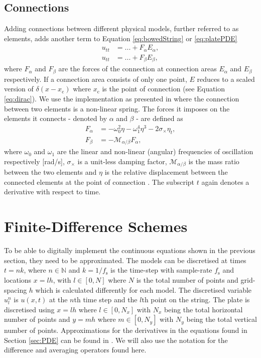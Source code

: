 \documentclass{article}
\begin{document}
\subsection{Connections}\label{sec:connections}
Adding connections between different physical models, further referred to as elements, adds another term to Equation \eqref{eq:bowedString} or \eqref{eq:platePDE}
\begin{equation}
\begin{aligned}
    u_{tt} &= ... + F_\alpha E_\alpha, \\
    u_{tt} &= ... + F_\beta E_\beta,
\end{aligned}
\end{equation}
where $F_\alpha$ and $F_\beta$ are the forces of the connection at connection areas $E_\alpha$ and $E_\beta$ respectively. If a connection area consists of only one point, $E$ reduces to a scaled version of $\delta(x-x_\text{c})$ where $x_\text{c}$ is the point of connection (see Equation \eqref{eq:dirac}). We use the implementation as presented in \cite{Bilbao2009:ModularPercussion} where the connection between two elements is a non-linear spring. The forces it imposes on the elements it connects - denoted by $\alpha$ and $\beta$ - are defined as
\begin{subequations}\label{eq:connectionsPDE}
\begin{align}
    F_\alpha &= -\omega_0^2\eta - \omega_1^4\eta^3 - 2\sigma_\times\eta_t,\\
    F_\beta &= -\mathcal{M}_{\alpha/\beta}F_\alpha,
\end{align}
\end{subequations}
where $\omega_0$ and $\omega_1$ are the linear and non-linear (angular) frequencies of oscillation respectively [rad/s], $\sigma_\times$ is a unit-less damping factor, $\mathcal{M}_{\alpha/\beta}$ is the mass ratio between the two elements and $\eta$ is the relative displacement between the connected elements at the point of connection%
. The subscript $t$ again denotes a derivative with respect to time.

\section{Finite-Difference Schemes}\label{sec:FDS}
To be able to digitally implement the continuous equations shown in the previous section, they need to be approximated. The models can be discretised at times $t = nk$, where $n \in \mathbb{N}$ and $k = 1 / f_\text{s}$ is the time-step with sample-rate $f_\text{s}$ and locations $x = lh$, with $l \in [0,N]$ where $N$ is the total number of points and grid-spacing $h$ which is calculated differently for each model. The discretised variable $u_l^n$ is $u(x,t)$ at the $n$th time step and the $l$th point on the string. The plate is discretised using $x = lh$ where $l \in [0,N_x]$ with $N_x$ being the total horizontal number of points and $y = mh$ where $m \in [0,N_y]$ with $N_y$ being the total vertical number of points. 
Approximations for the derivatives in the equations found in Section \ref{sec:PDE} can be found in \cite{Bilbao2009:NumericalSoundSynthesis}. We will also use the notation for the difference and averaging operators found here. 
\end{document}
